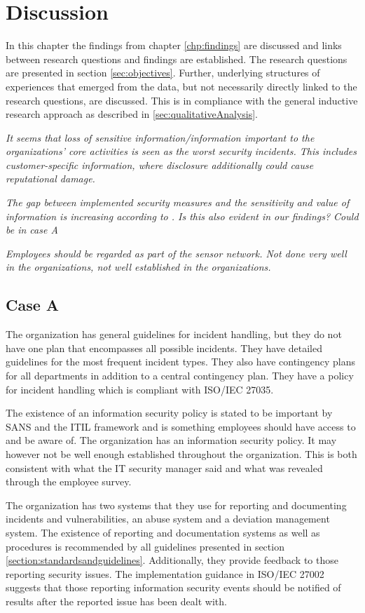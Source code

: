 \chapter{Discussion}
\label{chp:discussion}
In this chapter the findings from chapter \ref{chp:findings} are discussed and links between research questions and findings are established. The research questions are presented in section \ref{sec:objectives}. Further, underlying structures of experiences that emerged from the data, but not necessarily directly linked to the research questions, are discussed. This is in compliance with the general inductive research approach as described in \ref{sec:qualitativeAnalysis}.  

\textit{It seems that loss of sensitive information/information important to the organizations' core activities is seen as the worst security incidents. This includes customer-specific information, where disclosure additionally could cause reputational damage.}

\textit{The gap between implemented security measures and the sensitivity and value of information is increasing according to \cite{Morketall2012}. Is this also evident in our findings? Could be in case A}

\textit{Employees should be regarded as part of the sensor network. Not done very well in the organizations, not well established in the organizations.}

\section{Case A}
The organization has general guidelines for incident handling, but they do not have one plan that encompasses all possible incidents. They have detailed guidelines for the most frequent incident types. They also have contingency plans for all departments in addition to a central contingency plan. They have a policy for incident handling which is compliant with ISO/IEC 27035. 

The existence of an information security policy is stated to be important by SANS and the \acs{ITIL} framework and is something employees should have access to and be aware of. The organization has an information security policy. It may however not be well enough established throughout the organization. This is both consistent with what the IT security manager said and what was revealed through the employee survey.

The organization has two systems that they use for reporting and documenting incidents and vulnerabilities, an abuse system and a deviation management system. The existence of reporting and documentation systems as well as procedures is recommended by all guidelines presented in section \ref{section:standardsandguidelines}. Additionally, they provide feedback to those reporting security issues. The implementation guidance in ISO/IEC 27002 suggests that those reporting information security events should be notified of results after the reported issue has been dealt with. 

